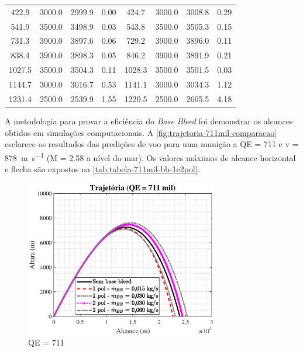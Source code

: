 \begin{table}[ht]
{\begin{tabular}{c|c|c|c|c|c|c|c}
        \num{422,9} & \num{3000,0} & \num{2999,9} & \num{0,00} & \num{424,7} & \num{3000,0} & \num{3008,8} & \num{0,29} \\
        \num{541,9} & \num{3500,0} & \num{3498,9} & \num{0,03} & \num{543,8} & \num{3500,0} & \num{3505,3} & \num{0,15} \\
        \num{731,3} & \num{3900,0} & \num{3897,6} & \num{0,06} & \num{729,2} & \num{3900,0} & \num{3896,0} & \num{0,11} \\
        \num{838,4} & \num{3900,0} & \num{3898,3} & \num{0,05} & \num{846,2} & \num{3900,0} & \num{3891,9} & \num{0,21} \\
        \num{1027,5} & \num{3500,0} & \num{3504,3} & \num{0,11} & \num{1028,3} & \num{3500,0} & \num{3501,5} & \num{0,03} \\
        \num{1144,7} & \num{3000,0} & \num{3016,7} & \num{0,53} & \num{1141,1} & \num{3000,0} & \num{3034,3} & \num{1,12} \\
        \num{1231,4} & \num{2500,0} & \num{2539,9} & \num{1,55} & \num{1220,5} & \num{2500,0} & \num{2605,5} & \num{4,18} \\ 
        \hline
    \end{tabular}%
    }
    \label{tab:tabela-validacao-PRODAS-e-tabelas-de-tiro-M107}
\end{table}

A metodologia para provar a eficiência do \textit{Base Bleed} foi demonstrar os alcances obtidos em simulações computacionais. A \autoref{fig:trajetoria-711mil-comparacao} esclarece os resultados das predições de voo para uma munição a QE = \qty{711}{\milliradian} e v = \qty{878}{\metre\per\second} (M = \num{2,58} a nível do mar). Os valores máximos de alcance horizontal e flecha são expostos na  \autoref{tab:tabela-711mil-bb-1e2pol}.

\begin{figure}[!htpb]
	\centering
    \includegraphics[width=0.75\textwidth]{foto1-qe711mil-comparacao.eps}
    \caption[QE = \qty{711}{\milliradian}]{QE = \qty{711}{\milliradian}}
    \label{fig:trajetoria-711mil-comparacao}
\end{figure}

